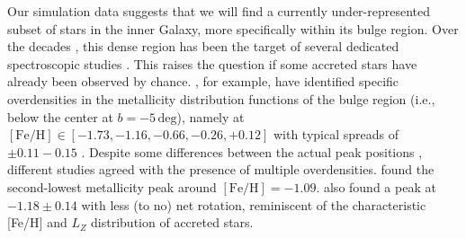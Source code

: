 \documentclass[fleqn,usenatbib]{mnras}
\begin{document}
Our simulation data suggests that we will find a currently under-represented subset of stars in the inner Galaxy, more specifically within its bulge region. Over the decades \citep[see for example][for a review]{Barbuy2018}, this dense region has been the target of several dedicated spectroscopic studies \citep[for example][]{Ness2013, Bensby2017, Lucey2019}. This raises the question if some accreted stars have already been observed by chance. \citet{Ness2013, Ness2013b}, for example, have identified specific overdensities in the metallicity distribution functions of the bulge region (i.e., below the center at $b = -5\,\mathrm{deg}$), namely at $\mathrm{[Fe/H]} \in [-1.73, -1.16, -0.66, -0.26, +0.12]$ with typical spreads of $\pm0.11-0.15$ \citep[see also][]{Portail2017}. Despite some differences between the actual peak positions \citep[compare for example Fig.~4 by][]{Barbuy2018}, different studies agreed with the presence of multiple overdensities. \citet{Bensby2017} found the second-lowest metallicity peak around $\mathrm{[Fe/H]} = -1.09$. \citet{Portail2017} also found a peak at $-1.18\pm 0.14$ with less (to no) net rotation, reminiscent of the characteristic [Fe/H] and $L_Z$ distribution of accreted stars. 
\end{document}
